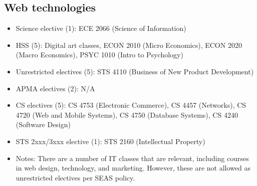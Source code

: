 \documentclass[10pt,letter]{book}
\newenvironment{itemlist}{
\begin{itemize}
\setlength{\itemsep}{0pt}
\setlength{\parskip}{0pt}}
{\end{itemize}}
\begin{document}
\subsection{Web technologies}
\begin{itemlist}
\item Science elective (1): ECE 2066 (Science of Information)
\item HSS (5): Digital art classes, ECON 2010 (Micro Economics), ECON 2020 (Macro Economics), PSYC 1010 (Intro to Psychology)
\item Unrestricted electives (5): STS 4110 (Business of New Product Development)
\item APMA electives (2): N/A
\item CS electives (5): CS 4753 (Electronic Commerce), CS 4457 (Networks), CS 4720 (Web and Mobile Systems), CS 4750 (Database Systems), CS 4240 (Software Design)
\item STS 2xxx/3xxx elective (1): STS 2160 (Intellectual Property)
\item Notes: There are a number of IT classes that are relevant, including courses in web design, technology, and marketing.  However, these are not allowed as unrestricted electives per SEAS policy. 
\end{itemlist}
\end{document}
